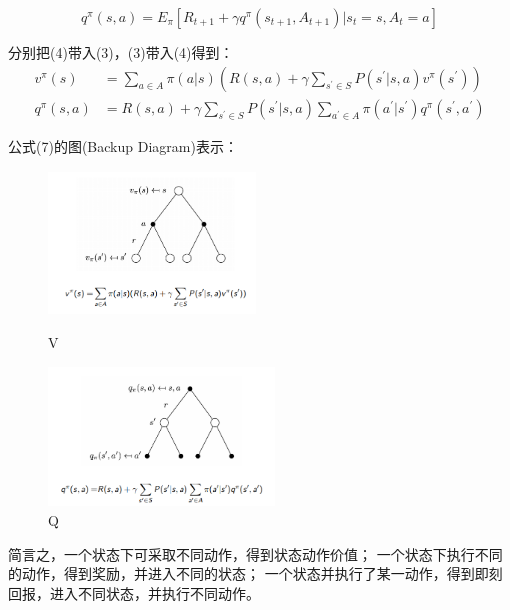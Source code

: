 \documentclass[UTF8]{ctexart}
\begin{document}
\begin{equation}
q^{\pi}(s, a)=E_{\pi}\left[R_{t+1}+\gamma q^{\pi}\left(s_{t+1}, A_{t+1}\right) | s_{t}=s, A_{t}=a\right]
\end{equation}

分别把(4)带入(3)，(3)带入(4)得到：
\begin{equation}
    \begin{aligned}
        v^{\pi}(s) &=\sum_{a \in A} \pi(a | s)\left(R(s, a)+\gamma \sum_{s^{\prime} \in S} P\left(s^{\prime} | s, a\right) v^{\pi}\left(s^{\prime}\right)\right)   \\
        q^{\pi}(s, a) &=R(s, a)+\gamma \sum_{s^{\prime} \in S} P\left(s^{\prime} | s, a\right) \sum_{a^{\prime} \in A} \pi\left(a^{\prime} | s^{\prime}\right) 
        q^{\pi}\left(s^{\prime}, a^{\prime}\right) 
    \end{aligned}
\end{equation}


公式(7)的图(Backup Diagram)表示：

\begin{figure}[htbp]
	\centering
	\begin{minipage}[t]{0.48\textwidth}
	\centering
	\includegraphics[width=5.5cm, height=3.8cm]{./pic/vpi.png}
	\caption{V}
	\label{piVpi}
	\end{minipage}
	\begin{minipage}[t]{0.48\textwidth}
		\centering
		\includegraphics[width=6cm,height=3.7cm]{./pic/qpi.png}
		\caption{Q}
		\label{picQpi}
	\end{minipage}
\end{figure}

简言之，一个状态下可采取不同动作，得到状态动作价值；
一个状态下执行不同的动作，得到奖励，并进入不同的状态；
一个状态并执行了某一动作，得到即刻回报，进入不同状态，并执行不同动作。
\end{document}
